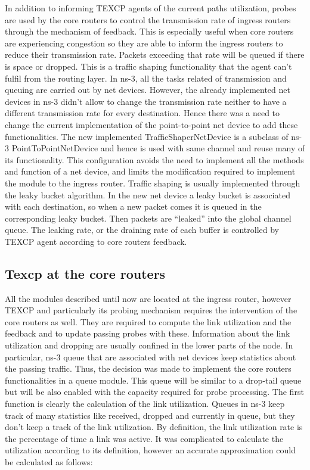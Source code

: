 In addition to informing TEXCP agents of the current paths utilization, probes are used by the core routers to control the transmission rate of ingress routers through the mechanism of feedback. This is especially useful when core routers are experiencing congestion so they are able to inform the ingress routers to reduce their transmission rate. Packets exceeding that rate will be queued if there is space or dropped. This is a traffic shaping functionality that the agent can't fulfil from the routing layer. In ns-3, all the tasks related of transmission and queuing are carried out by net devices. However, the already implemented net devices in ns-3 didn't allow to change the transmission rate neither to have a different transmission rate for every destination. Hence there was a need to change the current implementation of the point-to-point net device to add these functionalities. The new implemented TrafficShaperNetDevice is a subclass of ns-3 PointToPointNetDevice and hence is used with same channel and reuse many of its functionality. This configuration avoids the need to implement all the methods and function of a net device, and limits the modification required to implement the module to the ingress router. Traffic shaping is usually implemented through the leaky bucket algorithm. In the new net device a leaky bucket is associated with each destination, so when a new packet comes it is queued in the corresponding leaky bucket. Then packets are “leaked” into the global channel queue. The leaking rate, or the draining rate of each buffer is controlled  by TEXCP agent according to core routers feedback. 

\subsection{Texcp at the core routers}

All the modules described until now are located at the ingress router, however TEXCP and particularly its probing mechanism requires the intervention of the core routers as well. They are required to compute the link utilization and the feedback and to update passing probes with these. Information about the link utilization and dropping are usually confined in the lower parts of the node. In particular, ns-3 queue that are associated with net devices keep statistics about the passing traffic. Thus, the decision was made to implement the core routers functionalities in a queue module. This queue will be similar to a drop-tail queue but will be also enabled with the capacity required for probe processing. The first function is clearly the calculation of the link utilization. Queues in ns-3 keep track of many statistics like received, dropped and currently in queue, but they don't keep a track of the link utilization. By definition, the link utilization rate is the percentage of time a link was active. It was complicated to calculate the utilization according to its definition, however an accurate approximation could be calculated as follows:

